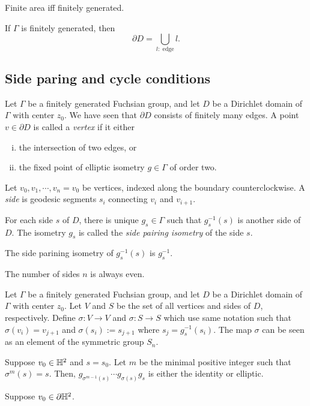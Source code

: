 \documentclass[12pt]{article}
\begin{document}
\begin{prb}
Finite area iff finitely generated.
\begin{parts}
\item If $\Gamma$ is finitely generated, then
\[\partial D=\bigcup_{l:\text{ edge}}l.\]
\end{parts}
\end{prb}

\subsection{Side paring and cycle conditions}

\begin{prb}
Let $\Gamma$ be a finitely generated Fuchsian group, and let $D$ be a Dirichlet domain of $\Gamma$ with center $z_0$.
We have seen that $\partial D$ consists of finitely many edges.
A point $v\in\partial D$ is called a \emph{vertex} if it either 
\begin{enumerate}[(i)]
\item the intersection of two edges, or
\item the fixed point of elliptic isometry $g\in\Gamma$ of order two.
\end{enumerate}
Let $v_0,v_1,\cdots,v_n=v_0$ be vertices, indexed along the boundary counterclockwise.
A \emph{side} is geodesic segments $s_i$ connecting $v_i$ and $v_{i+1}$.
\begin{parts}
\item For each side $s$ of $D$, there is unique $g_s\in\Gamma$ such that $g_s^{-1}(s)$ is another side of $D$. The isometry $g_s$ is called the \emph{side pairing isometry} of the side $s$.
\item The side parining isometry of $g_s^{-1}(s)$ is $g_s^{-1}$.
\item The number of sides $n$ is always even.
\end{parts}
\end{prb}
\begin{pf}
\end{pf}

\begin{prb}
Let $\Gamma$ be a finitely generated Fuchsian group, and let $D$ be a Dirichlet domain of $\Gamma$ with center $z_0$.
Let $V$ and $S$ be the set of all vertices and sides of $D$, respectively.
Define $\sigma:V\to V$ and $\sigma:S\to S$ which use same notation such that $\sigma(v_i)=v_{j+1}$ and $\sigma(s_i):=s_{j+1}$ where $s_j=g_s^{-1}(s_i)$.
The map $\sigma$ can be seen as an element of the symmetric group $S_n$.
\begin{parts}
\item Suppose $v_0\in\mathbb{H}^2$ and $s=s_0$. Let $m$ be the minimal positive integer such that $\sigma^m(s)=s$. Then, $g_{\sigma^{m-1}(s)}\cdots g_{\sigma(s)}g_s$ is either the identity or elliptic.
\item Suppose $v_0\in\partial\mathbb{H}^2$.
\end{parts}
\end{prb}
\end{document}
